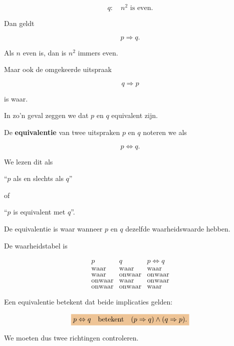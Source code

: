 \documentclass{ximera}
\begin{document}
\[
q:\quad n^2\text{ is even}.
\]

Dan geldt

\[
p\Rightarrow q.
\]

Als $n$ even is, dan is $n^2$ immers even.

Maar ook de omgekeerde uitspraak

\[
q\Rightarrow p
\]

is waar.

In zo'n geval zeggen we dat $p$ en $q$ equivalent zijn.


\begin{definitie}

De \textbf{equivalentie} van twee uitspraken $p$ en $q$ noteren we als

\[
p\Leftrightarrow q.
\]

We lezen dit als

\begin{center}
``$p$ als en slechts als $q$''
\end{center}

of

\begin{center}
``$p$ is equivalent met $q$''.
\end{center}

De equivalentie is waar wanneer $p$ en $q$ dezelfde waarheidswaarde
hebben.

\end{definitie}


De waarheidstabel is

\[
\begin{array}{c|c|c}
p&q&p\Leftrightarrow q\\
\hline
\text{waar}&\text{waar}&\text{waar}\\
\text{waar}&\text{onwaar}&\text{onwaar}\\
\text{onwaar}&\text{waar}&\text{onwaar}\\
\text{onwaar}&\text{onwaar}&\text{waar}
\end{array}
\]


\begin{opmerking}

Een equivalentie betekent dat beide implicaties gelden:

\[
\important{
p\Leftrightarrow q
\quad\text{betekent}\quad
(p\Rightarrow q)\land(q\Rightarrow p).
}
\]

We moeten dus twee richtingen controleren.

\end{opmerking}
\end{document}
